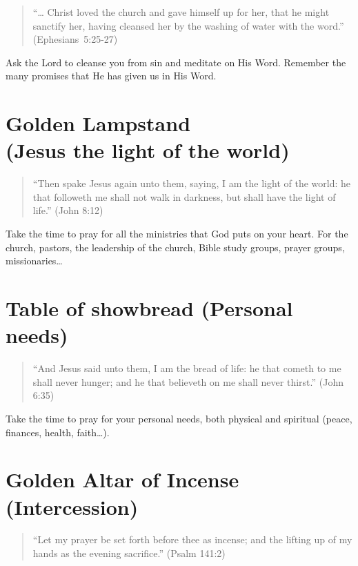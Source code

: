 \begin{quote}
``\ldots{} Christ loved the church and gave himself up for her,
    that he might sanctify her, having cleansed her by the washing
    of water with the word.''  (Ephesians~5:25-27)
\end{quote}

Ask the Lord to cleanse you from sin and meditate on His Word.
Remember the many promises that He has given us in His Word.



\section{Golden Lampstand\\(Jesus the light of the world)}


\begin{quote}
``Then spake Jesus again unto them, saying, I am the light of the world:
    he that followeth me shall not walk in darkness,
    but shall have the light of life.'' (John 8:12)
\end{quote}

Take the time to pray for all the ministries that God puts on your heart.
For the church, pastors, the leadership of the church, Bible study groups,
prayer groups, missionaries\ldots{}


\section{Table of showbread (Personal needs)}

\begin{quote}
``And Jesus said unto them, I am the bread of life:
    he that cometh to me shall never hunger;
    and he that believeth on me shall never thirst.'' (John 6:35)
\end{quote}

Take the time to pray for your personal needs,
both physical and spiritual (peace, finances, health, faith\ldots{}).


\section{Golden Altar of Incense\\(Intercession)}

\begin{quote}
``Let my prayer be set forth before thee as incense;
    and the lifting up of my hands as the evening sacrifice.'' (Psalm 141:2)
\end{quote}

